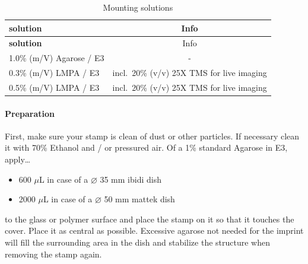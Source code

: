 \documentclass[11pt,singlespacinge,twoside]{reedthesis} %
\providecommand{\tightlist}{%
  \setlength{\itemsep}{0pt}\setlength{\parskip}{0pt}}
\begin{document}
\begin{longtable}[]{@{}lc@{}}
\caption{\label{tab:mountsol} Mounting solutions}\tabularnewline
\toprule
\begin{minipage}[b]{0.39\columnwidth}\raggedright
\textbf{solution}\strut
\end{minipage} & \begin{minipage}[b]{0.55\columnwidth}\centering
Info\strut
\end{minipage}\tabularnewline
\midrule
\endfirsthead
\toprule
\begin{minipage}[b]{0.39\columnwidth}\raggedright
\textbf{solution}\strut
\end{minipage} & \begin{minipage}[b]{0.55\columnwidth}\centering
Info\strut
\end{minipage}\tabularnewline
\midrule
\endhead
\begin{minipage}[t]{0.39\columnwidth}\raggedright
1.0\% (m/V) Agarose / E3\strut
\end{minipage} & \begin{minipage}[t]{0.55\columnwidth}\centering
-\strut
\end{minipage}\tabularnewline
\begin{minipage}[t]{0.39\columnwidth}\raggedright
0.3\% (m/V) LMPA / E3\strut
\end{minipage} & \begin{minipage}[t]{0.55\columnwidth}\centering
incl.~20\% (v/v) 25X TMS for live imaging\strut
\end{minipage}\tabularnewline
\begin{minipage}[t]{0.39\columnwidth}\raggedright
0.5\% (m/V) LMPA / E3\strut
\end{minipage} & \begin{minipage}[t]{0.55\columnwidth}\centering
incl.~20\% (v/v) 25X TMS for live imaging\strut
\end{minipage}\tabularnewline
\bottomrule
\end{longtable}
\hypertarget{preparation}{%
\paragraph{Preparation}\label{preparation}}

First, make sure your stamp is clean of dust or other particles. If necessary clean it with 70\% Ethanol and / or pressured air. Of a 1\% standard Agarose in E3, apply\ldots{}
\begin{itemize}
\tightlist
\item
  600 \(\mu\)L in case of a \(\varnothing\) 35 mm ibidi dish
\item
  2000 \(\mu\)L in case of a \(\varnothing\) 50 mm mattek dish
\end{itemize}
to the glass or polymer surface and place the stamp on it so that it touches the cover. Place it as central as possible. Excessive agarose not needed for the imprint will fill the surrounding area in the dish and stabilize the structure when removing the stamp again.
\end{document}
